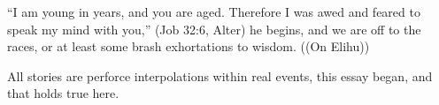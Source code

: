 ``I am young in years, and you are aged. Therefore I was awed and feared to speak my mind with you,'' (Job 32:6, Alter) he begins, and we are off to the races, or at least some brash exhortations to wisdom.
((On Elihu))

All stories are perforce interpolations within real events, this essay began, and that holds true here.

